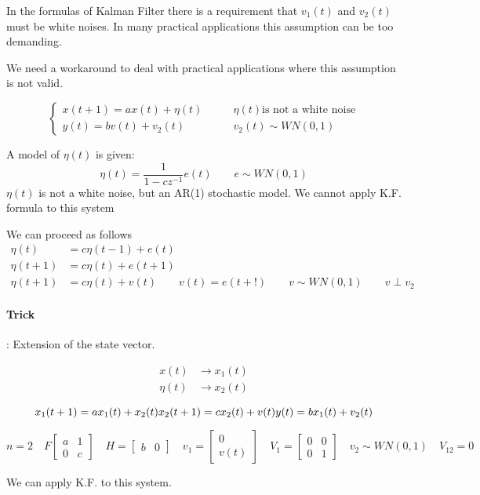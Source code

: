 
\begin{remark}
    In the formulas of Kalman Filter there is a requirement that $v_1(t)$ and $v_2(t)$ must be white noises.
    In many practical applications this assumption can be too demanding.

    We need a workaround to deal with practical applications where this assumption is not valid.

    \[
        \begin{cases}
            x(t+1) = ax(t) + \eta(t) \qquad & \eta(t) \text{is not a white noise}\\
            y(t) = bv(t) + v_2(t) \qquad & v_2(t) \sim WN(0,1)
        \end{cases}
    \]

    A model of $\eta(t)$ is given:
    \[
        \eta(t) = \frac{1}{1-cz^{-1}}e(t) \qquad e \sim WN(0,1)
    \]
    $\eta(t)$ is not a white noise, but an AR(1) stochastic model.
    We cannot apply K.F. formula to this system

    We can proceed as follows
    \begin{align*}
        \eta(t) &= c\eta(t-1) + e(t) \\
        \eta(t+1) &= c\eta(t) + e(t+1) \\
        \eta(t+1) &= c\eta(t) + v(t) \qquad v(t) = e(t+!) \qquad v \sim WN(0,1) \qquad v \perp v_2
    \end{align*}

    \paragraph{Trick}: Extension of the state vector.

    \begin{align*}
        x(t) &\rightarrow x_1(t) \\
        \eta(t) &\rightarrow x_2(t)
    \end{align*}

    \[
        x_1(t+1) = ax_1(t) + x_2(t) \\
        x_2(t+1) = cx_2(t) + v(t) \\
        y(t) = bx_1(t) + v_2(t)
    \]

    \[
        n=2 \quad F\begin{bmatrix}
            a & 1 \\
            0 & c
        \end{bmatrix}
        \quad H = \begin{bmatrix}
            b & 0
        \end{bmatrix}
        \quad v_1 = \begin{bmatrix}
            0 \\ v(t)
        \end{bmatrix}
        \quad V_1 = \begin{bmatrix}
            0 & 0 \\
            0 & 1
        \end{bmatrix}
        \quad v_2 \sim WN(0,1)
        \quad V_{12} = 0
    \]

    We can apply K.F. to this system.
\end{remark}

